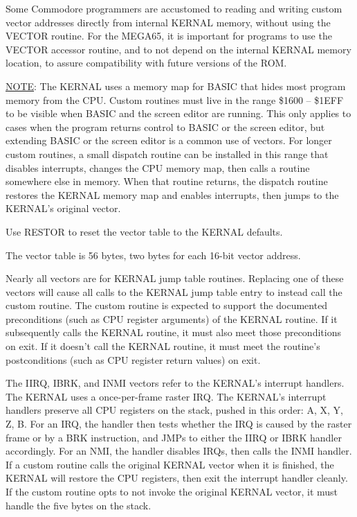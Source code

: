 \begin{description}[leftmargin=2cm,style=nextline]
        Some Commodore programmers are accustomed to reading and writing custom vector addresses directly from internal KERNAL memory, without using the VECTOR routine. For the MEGA65, it is important for programs to use the VECTOR accessor routine, and to not depend on the internal KERNAL memory location, to assure compatibility with future versions of the ROM.

        \underline{NOTE}: The KERNAL uses a memory map for BASIC that hides most program memory from the CPU. Custom routines must live in the range \$1600 -- \$1EFF to be visible when BASIC and the screen editor are running. This only applies to cases when the program returns control to BASIC or the screen editor, but extending BASIC or the screen editor is a common use of vectors. For longer custom routines, a small dispatch routine can be installed in this range that disables interrupts, changes the CPU memory map, then calls a routine somewhere else in memory. When that routine returns, the dispatch routine restores the KERNAL memory map and enables interrupts, then jumps to the KERNAL's original vector.

        Use RESTOR to reset the vector table to the KERNAL defaults.

    \item [Vector table:]
        The vector table is 56 bytes, two bytes for each 16-bit vector address.

        Nearly all vectors are for KERNAL jump table routines. Replacing one of these vectors will cause all calls to the KERNAL jump table entry to instead call the custom routine. The custom routine is expected to support the documented preconditions (such as CPU register arguments) of the KERNAL routine. If it subsequently calls the KERNAL routine, it must also meet those preconditions on exit. If it doesn't call the KERNAL routine, it must meet the routine's postconditions (such as CPU register return values) on exit.

        The IIRQ, IBRK, and INMI vectors refer to the KERNAL's interrupt handlers. The KERNAL uses a once-per-frame raster IRQ. The KERNAL's interrupt handlers preserve all CPU registers on the stack, pushed in this order: A, X, Y, Z, B. For an IRQ, the handler then tests whether the IRQ is caused by the raster frame or by a BRK instruction, and JMPs to either the IIRQ or IBRK handler accordingly. For an NMI, the handler disables IRQs, then calls the INMI handler. If a custom routine calls the original KERNAL vector when it is finished, the KERNAL will restore the CPU registers, then exit the interrupt handler cleanly. If the custom routine opts to not invoke the original KERNAL vector, it must handle the five bytes on the stack.


\end{description}
